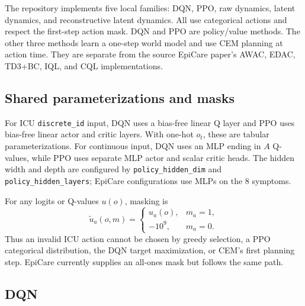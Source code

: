 \documentclass[10pt,twocolumn]{article}
\newcommand{\code}[1]{\texttt{#1}}
\begin{document}
The repository implements five local families: DQN, PPO, raw dynamics, latent dynamics, and reconstructive latent dynamics. All use categorical actions and respect the first-step action mask. DQN and PPO are policy/value methods. The other three methods learn a one-step world model and use CEM planning at action time. They are separate from the source EpiCare paper's AWAC, EDAC, TD3+BC, IQL, and CQL implementations.

\subsection{Shared parameterizations and masks}

For ICU \code{discrete\_id} input, DQN uses a bias-free linear Q layer and PPO uses bias-free linear actor and critic layers. With one-hot $o_t$, these are tabular parameterizations. For continuous input, DQN uses an MLP ending in $A$ Q-values, while PPO uses separate MLP actor and scalar critic heads. The hidden width and depth are configured by \code{policy\_hidden\_dim} and \code{policy\_hidden\_layers}; EpiCare configurations use MLPs on the 8 symptoms.

For any logits or Q-values $u(o)$, masking is
\begin{equation}
    \widetilde{u}_a(o,m) =
    \begin{cases}
       u_a(o), & m_a=1,\\
       -10^9, & m_a=0.
    \end{cases}
\end{equation}
Thus an invalid ICU action cannot be chosen by greedy selection, a PPO categorical distribution, the DQN target maximization, or CEM's first planning step. EpiCare currently supplies an all-ones mask but follows the same path.

\subsection{DQN}
\label{sec:dqn}
\end{document}

